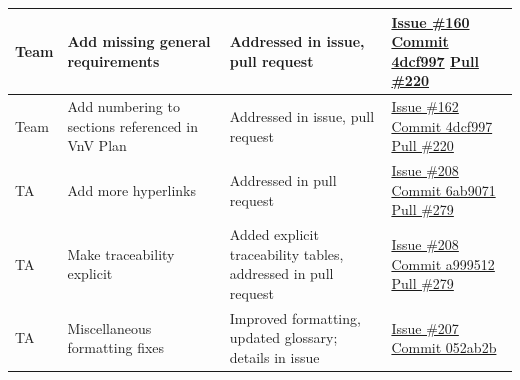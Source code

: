 \documentclass[12pt, titlepage]{article}
\begin{document}
\begin{longtable}{|p{2cm}|p{4cm}|p{5cm}|p{4cm}|}
Team & Add missing general requirements & Addressed in issue, pull request & \href{https://github.com/OmarHassanAdelhamid/Five-of-a-Kind-capstone-project-/issues/160}{Issue \#160}
\newline\href{https://github.com/OmarHassanAdelhamid/Five-of-a-Kind-capstone-project-/pull/220/commits/4dcf99741fcdd6f39f03d536ecb05cabfae45d39}{Commit 4dcf997}
\newline\href{https://github.com/OmarHassanAdelhamid/Five-of-a-Kind-capstone-project-/pull/220}{Pull \#220} \\ \hline
Team & Add numbering to sections referenced in VnV Plan & Addressed in issue, pull request & \href{https://github.com/OmarHassanAdelhamid/Five-of-a-Kind-capstone-project-/issues/162}{Issue \#162}
\newline\href{https://github.com/OmarHassanAdelhamid/Five-of-a-Kind-capstone-project-/pull/220/commits/4dcf99741fcdd6f39f03d536ecb05cabfae45d39}{Commit 4dcf997}
\newline\href{https://github.com/OmarHassanAdelhamid/Five-of-a-Kind-capstone-project-/pull/220}{Pull \#220} \\ \hline
TA & Add more hyperlinks & Addressed in pull request & \href{https://github.com/OmarHassanAdelhamid/Five-of-a-Kind-capstone-project-/issues/208}{Issue \#208}
\newline\href{https://github.com/OmarHassanAdelhamid/Five-of-a-Kind-capstone-project-/pull/279/commits/6ab9071c341c1a43b016afde0d60a40277481fa6}{Commit 6ab9071}
\newline\href{https://github.com/OmarHassanAdelhamid/Five-of-a-Kind-capstone-project-/pull/279}{Pull \#279} \\ \hline
TA & Make traceability explicit & Added explicit traceability tables, addressed in pull request & \href{https://github.com/OmarHassanAdelhamid/Five-of-a-Kind-capstone-project-/issues/208}{Issue \#208}
\newline\href{https://github.com/OmarHassanAdelhamid/Five-of-a-Kind-capstone-project-/pull/279/commits/a99951220dd88428032f56d4d9d3810742d400b8}{Commit a999512}
\newline\href{https://github.com/OmarHassanAdelhamid/Five-of-a-Kind-capstone-project-/pull/279}{Pull \#279} \\ \hline
TA & Miscellaneous formatting fixes & Improved formatting, updated glossary; details in issue & \href{https://github.com/OmarHassanAdelhamid/Five-of-a-Kind-capstone-project-/issues/207}{Issue \#207}
\newline\href{https://github.com/OmarHassanAdelhamid/Five-of-a-Kind-capstone-project-/pull/279/commits/052ab2b02be49545426edea2cbbe768122050106}{Commit 052ab2b}

\end{longtable}
\end{document}
